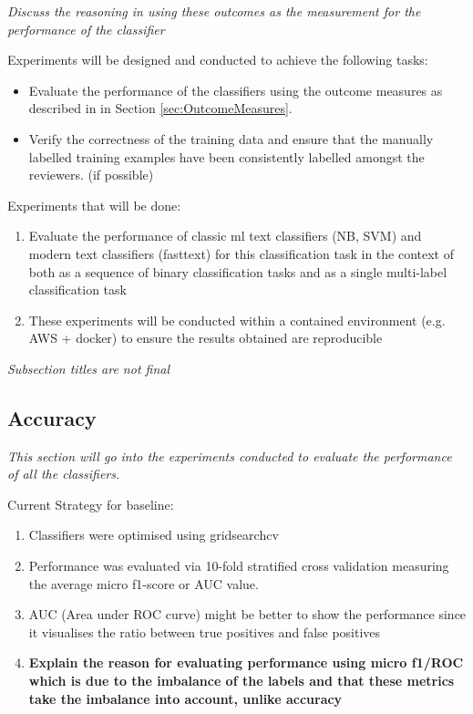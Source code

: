 \documentclass[a4paper,twoside,phd]{BYUPhys}
\begin{document}
\textit{Discuss the reasoning in using these outcomes as the measurement for the performance of the classifier}

Experiments will be designed and conducted to achieve the following tasks:

\begin{itemize}
	\item Evaluate the performance of the classifiers using the outcome measures as described in in Section \ref{sec:OutcomeMeasures}.
	\item Verify the correctness of the training data and ensure that the manually labelled training examples have been consistently labelled amongst the reviewers. (if possible)
\end{itemize} 


Experiments that will be done:
\begin{enumerate}[-]
	\item Evaluate the performance of classic ml text classifiers (NB, SVM) and modern text classifiers (fasttext) for this classification task in the context of both as a sequence of binary classification tasks and as a single multi-label classification task
	\item These experiments will be conducted within a contained environment (e.g. AWS + docker) to ensure the results obtained are reproducible 
\end{enumerate}

\textit{Subsection titles are not final}
\subsection{Accuracy}
\label{sec:AccuracyExperiments}
\textit{This section will go into the experiments conducted to evaluate the performance of all the classifiers.}

Current Strategy for baseline:
\begin{enumerate}[-]
	\item Classifiers were optimised using gridsearchcv
	\item Performance was evaluated via 10-fold stratified cross validation measuring the average micro f1-score or AUC value.
	\item AUC (Area under ROC curve) might be better to show the performance since it visualises the ratio between true positives and false positives
	\item \textbf{Explain the reason for evaluating performance using micro f1/ROC which is due to the imbalance of the labels and that these metrics take the imbalance into account, unlike accuracy}
\end{enumerate}
\end{document}

